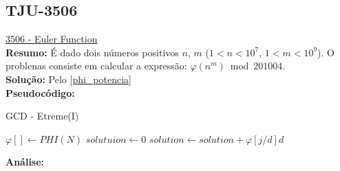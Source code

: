 \subsection{TJU-3506}
\href{http://acm.tju.edu.cn/toj/showp3506.html}{3506 - Euler Function} \\

\textbf{Resumo:}
É dado dois números positivos $n$, $m$ ($1 < n < 10^7$, $1 < m < 10^9$).
O problenas consiste em calcular a expressão: $\varphi(n^m) \bmod 201004.$
\\

\textbf{Solução:}
Pelo \autoref{phi_potencia}
\\

\textbf{Pseudocódigo:}
\begin{algorithm}
\caption{GCD - Etreme(I)}\label{gcd_extreme}
\begin{algorithmic}[1]
\State $\varphi[] \gets PHI(N)$
\State $solutuion \gets 0$
\State $solution \gets solution + \varphi[j/d] d$
\EndFor
\EndFor
\State {}
\EndProcedure
\end{algorithmic}
\end{algorithm}


\textbf{Análise:}


